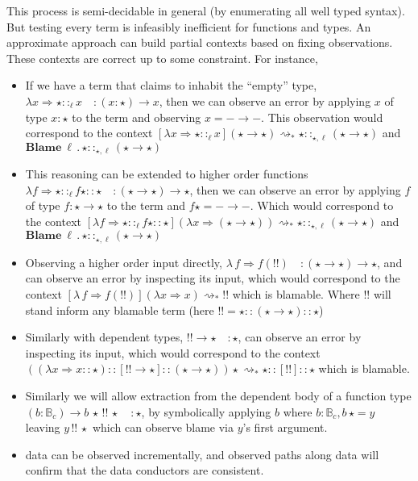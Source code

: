 This process is semi-decidable in general (by enumerating all well typed syntax).
But testing every term is infeasibly inefficient for functions and types.
An approximate approach can build partial contexts based on fixing observations.
These contexts are correct up to some constraint.
For instance, 
\begin{itemize}
\item
  If we have a term that claims to inhabit the ``empty'' type, $\lambda x\Rightarrow\star::_{\ell }x\quad:\left(x:\star\right)\rightarrow x$, 
    then we can observe an error by applying $x$ of type $x:\star$ to the term and observing $x=-\rightarrow-$.
  This observation  would correspond to the context $[\lambda x\Rightarrow\star::_{\ell }x]\left(\star\rightarrow\star\right)\rightsquigarrow_{*}\star::_{\star,\ell }\left(\star\rightarrow\star\right)$ and $\textbf{Blame}\:\ell \,.\,\star::_{\star,\ell }\left(\star\rightarrow\star\right)$
\item
  This reasoning can be extended to higher order functions $\lambda f\Rightarrow\star::_{\ell }f\star::\star\quad:\left(\star\rightarrow\star\right)\rightarrow\star$, 
    then we can observe an error by applying $f$ of type $f:\star\rightarrow\star$ to the term and $f\star=-\rightarrow-$.
  Which would correspond to the context $[\lambda f\Rightarrow\star::_{\ell }f\star::\star]\left(\lambda x\Rightarrow\left(\star\rightarrow\star\right)\right)\rightsquigarrow_{*}\star::_{\star,\ell }\left(\star\rightarrow\star\right)$ and $\textbf{Blame}\:\ell \,.\,\star::_{\star,\ell }\left(\star\rightarrow\star\right)$
\item Observing a higher order input directly, $\lambda\,f\Rightarrow f\left(!!\right)\quad:\left(\star\rightarrow\star\right)\rightarrow\star$,
and can observe an error by inspecting its input, which would correspond
to the context $[\lambda\,f\Rightarrow f\left(!!\right)]\left(\lambda x\Rightarrow x\right)\rightsquigarrow_{*}!!$
which is blamable. Where $!!$ will stand inform any blamable term
(here $!!=\star::\left(\star\rightarrow\star\right)::\star$) 
\item Similarly with dependent types, $!!\rightarrow\star\quad:\star$,
can observe an error by inspecting its input, which would correspond
to the context $\left(\left(\lambda x\Rightarrow x::\star\right)::[!!\rightarrow\star]::\left(\star\rightarrow\star\right)\right)\star\rightsquigarrow_{*}\star::[!!]::\star$
which is blamable.
\item Similarly we will allow extraction from the dependent body of a function
type $\left(b:\mathbb{B}_{c}\right)\rightarrow b\,\star\,!!\,\star\quad:\star$,
by symbolically applying $b$ where $b:\mathbb{B}_{c},b\,\star=y$
leaving $y\,!!\,\star$ which can observe blame via $y$'s first argument. 
\item data can be observed incrementally, and observed paths along data
will confirm that the data conductors are consistent.
\end{itemize}
